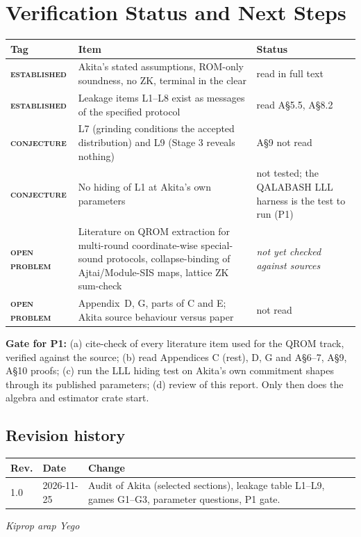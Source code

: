 \documentclass[11pt]{article}
\newcommand{\epitag}[3]{\colorbox{#2}{\textcolor{#1}{\textsc{\footnotesize\bfseries #3}}}}
\newcommand{\established}{\epitag{estgreen}{estbg}{established}}
\newcommand{\conjectureTag}{\epitag{conjyellow}{conjbg}{conjecture}}
\newcommand{\openproblem}{\epitag{openred}{openbg}{open problem}}
\renewcommand{\_}{\textunderscore\allowbreak{}}
\theoremstyle{definition}
\begin{document}
\section{Verification Status and Next Steps}
\begin{center}
\small\renewcommand{\arraystretch}{1.2}
\begin{tabular}{@{}p{}p{}p{}@{}}
\toprule
\textbf{Tag} & \textbf{Item} & \textbf{Status}\\
\midrule
\established & Akita's stated assumptions, ROM-only soundness, no ZK, terminal in the clear & read in full text\\
\established & Leakage items L1--L8 exist as messages of the specified protocol & read A\S5.5, A\S8.2\\
\conjectureTag & L7 (grinding conditions the accepted distribution) and L9 (Stage 3 reveals nothing) & A\S9 not read\\
\conjectureTag & No hiding of L1 at Akita's own parameters & not tested; the QALABASH LLL harness is the test to run (P1)\\
\openproblem & Literature on QROM extraction for multi-round coordinate-wise special-sound protocols, collapse-binding of Ajtai/Module-SIS maps, lattice ZK sum-check & \emph{not yet checked against sources}\\
\openproblem & Appendix~D, G, parts of C and E; Akita source behaviour versus paper & not read\\
\bottomrule
\end{tabular}
\end{center}
\textbf{Gate for P1:} (a) cite-check of every literature item used for the QROM track, verified against the source; (b) read Appendices C (rest), D, G and A\S6--7, A\S9, A\S10 proofs; (c) run the LLL hiding test on Akita's own commitment shapes through its published parameters; (d) review of this report. Only then does the algebra and estimator crate start.

\subsection*{Revision history}
\begin{tabular}{@{}p{}p{}p{}@{}}
\toprule
\textbf{Rev.} & \textbf{Date} & \textbf{Change}\\
\midrule
1.0 & 2026-11-25 & Audit of Akita (selected sections), leakage table L1--L9, games G1--G3, parameter questions, P1 gate.\\
\bottomrule
\end{tabular}

\vfill
\begin{center}\textit{Kiprop arap Yego}\end{center}
\end{document}
